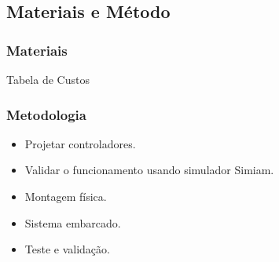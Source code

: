 \subsection{Materiais e Método}
\begin{frame}
	\frametitle{Materiais}
	\begin{block}{Tabela de Custos}
		
	\end{block}
\end{frame}

\begin{frame}
	\frametitle{Metodologia}
	\begin{block}{}
		\begin{itemize}
		  \item Projetar controladores.
		  \item Validar o funcionamento usando simulador Simiam.
		  \item Montagem física.
		  \item Sistema embarcado.
		  \item Teste e validação.
		\end{itemize}
	\end{block}
\end{frame}